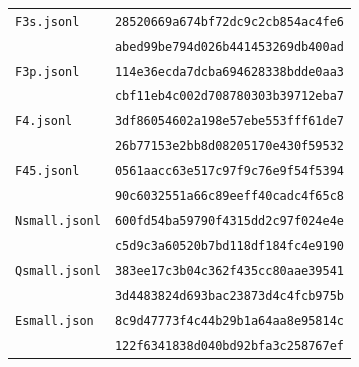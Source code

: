\begin{longtable}{lr}
\texttt{F3s.jsonl} & \texttt{28520669a674bf72dc9c2cb854ac4fe6}\\
 & \texttt{abed99be794d026b441453269db400ad}\\[3pt]
\texttt{F3p.jsonl} & \texttt{114e36ecda7dcba694628338bdde0aa3}\\
 & \texttt{cbf11eb4c002d708780303b39712eba7}\\[3pt]
\texttt{F4.jsonl} & \texttt{3df86054602a198e57ebe553fff61de7}\\
 & \texttt{26b77153e2bb8d08205170e430f59532}\\[3pt]
\texttt{F45.jsonl} & \texttt{0561aacc63e517c97f9c76e9f54f5394}\\
 & \texttt{90c6032551a66c89eeff40cadc4f65c8}\\[3pt]
\texttt{Nsmall.jsonl} & \texttt{600fd54ba59790f4315dd2c97f024e4e}\\
 & \texttt{c5d9c3a60520b7bd118df184fc4e9190}\\[3pt]
\texttt{Qsmall.jsonl} & \texttt{383ee17c3b04c362f435cc80aae39541}\\
 & \texttt{3d4483824d693bac23873d4c4fcb975b}\\[3pt]
\texttt{Esmall.json} & \texttt{8c9d47773f4c44b29b1a64aa8e95814c}\\
 & \texttt{122f6341838d040bd92bfa3c258767ef}\\[3pt]
\end{longtable}\endgroup
